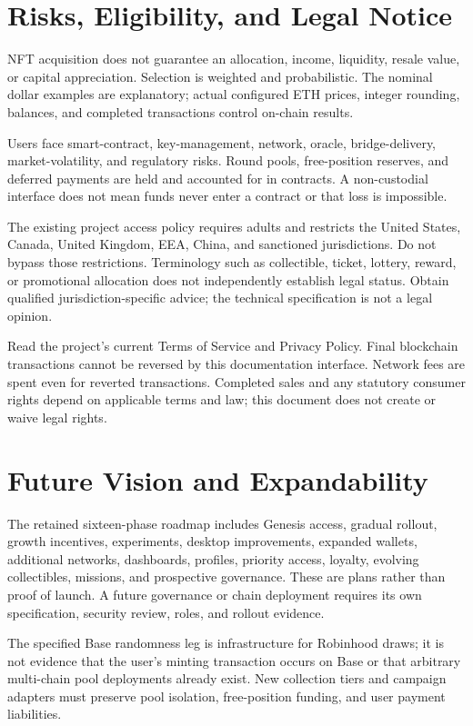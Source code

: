 \documentclass[
  10pt,
  letterpaper,
]{article}
\begin{document}
\section{Risks, Eligibility, and Legal
Notice}\label{risks-eligibility-and-legal-notice}

NFT acquisition does not guarantee an allocation, income, liquidity,
resale value, or capital appreciation. Selection is weighted and
probabilistic. The nominal dollar examples are explanatory; actual
configured ETH prices, integer rounding, balances, and completed
transactions control on-chain results.

Users face smart-contract, key-management, network, oracle,
bridge-delivery, market-volatility, and regulatory risks. Round pools,
free-position reserves, and deferred payments are held and accounted for
in contracts. A non-custodial interface does not mean funds never enter
a contract or that loss is impossible.

The existing project access policy requires adults and restricts the
United States, Canada, United Kingdom, EEA, China, and sanctioned
jurisdictions. Do not bypass those restrictions. Terminology such as
collectible, ticket, lottery, reward, or promotional allocation does not
independently establish legal status. Obtain qualified
jurisdiction-specific advice; the technical specification is not a legal
opinion.

Read the project's current Terms of Service and Privacy Policy. Final
blockchain transactions cannot be reversed by this documentation
interface. Network fees are spent even for reverted transactions.
Completed sales and any statutory consumer rights depend on applicable
terms and law; this document does not create or waive legal rights.

\section{Future Vision and
Expandability}\label{future-vision-and-expandability}

The retained sixteen-phase roadmap includes Genesis access, gradual
rollout, growth incentives, experiments, desktop improvements, expanded
wallets, additional networks, dashboards, profiles, priority access,
loyalty, evolving collectibles, missions, and prospective governance.
These are plans rather than proof of launch. A future governance or
chain deployment requires its own specification, security review, roles,
and rollout evidence.

The specified Base randomness leg is infrastructure for Robinhood draws;
it is not evidence that the user's minting transaction occurs on Base or
that arbitrary multi-chain pool deployments already exist. New
collection tiers and campaign adapters must preserve pool isolation,
free-position funding, and user payment liabilities.
\end{document}
